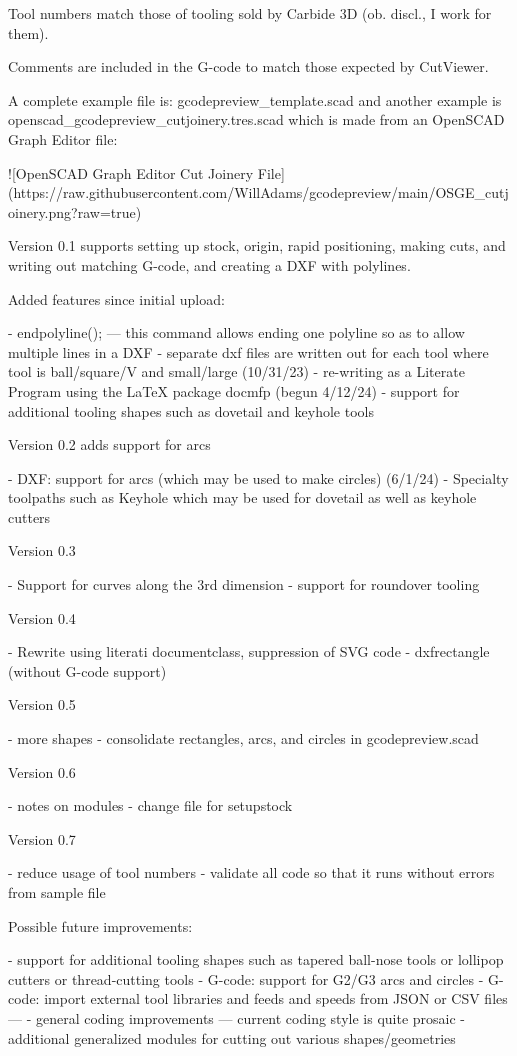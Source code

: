 \documentclass{ltxdoc}
\begin{document}
\begin{readme}
Tool numbers match those of tooling sold by Carbide 3D 
(ob. discl., I work for them). 

Comments are included in the G-code to match those 
expected by CutViewer.

A complete example file is: gcodepreview_template.scad 
and another example is openscad_gcodepreview_cutjoinery.tres.scad 
which is made from an OpenSCAD Graph Editor file:

![OpenSCAD Graph Editor Cut Joinery File](https://raw.githubusercontent.com/WillAdams/gcodepreview/main/OSGE_cutjoinery.png?raw=true)

Version 0.1 supports setting up stock, origin, rapid 
positioning, making cuts, and writing out matching 
G-code, and creating a DXF with polylines.

Added features since initial upload:

 - endpolyline(); --- this command allows ending one polyline so as to allow multiple lines in a DXF
 - separate dxf files are written out for each tool where tool is ball/square/V and small/large (10/31/23)
 - re-writing as a Literate Program using the LaTeX package docmfp (begun 4/12/24) 
 - support for additional tooling shapes such as dovetail and keyhole tools

Version 0.2 adds support for arcs 

 - DXF: support for arcs (which may be used to make circles) (6/1/24)
 - Specialty toolpaths such as Keyhole which may be used for dovetail as well as keyhole cutters

Version 0.3 

 - Support for curves along the 3rd dimension
 - support for roundover tooling
 
Version 0.4

 - Rewrite using literati documentclass, suppression of SVG code
 - dxfrectangle (without G-code support)

Version 0.5

 - more shapes
 - consolidate rectangles, arcs, and circles in gcodepreview.scad
 
Version 0.6

 - notes on modules
 - change file for setupstock

Version 0.7

 - reduce usage of tool numbers
 - validate all code so that it runs without errors from sample file

Possible future improvements:

 - support for additional tooling shapes such as tapered ball-nose tools or lollipop cutters or thread-cutting tools
 - G-code: support for G2/G3 arcs and circles
 - G-code: import external tool libraries and feeds and speeds from JSON or CSV files ---
 - general coding improvements --- current coding style is quite prosaic
 - additional generalized modules for cutting out various shapes/geometries


\end{readme}
\end{document}
